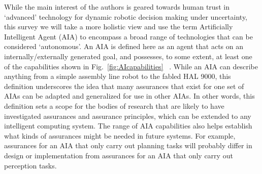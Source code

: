 
    While the main interest of the authors is geared towards human trust in `advanced' technology for dynamic robotic decision making under uncertainty, this survey we will take a more holistic view and use the term Artificially Intelligent Agent (AIA) to encompass a broad range of technologies that can be considered `autonomous'. 
    An AIA is defined here as an agent that acts on an internally/externally generated goal, and possesses, to some extent, at least one of the capabilities shown in Fig.~\ref{fig:AIcapabilities} ~\cite{Russell2010-wv,Nilsson2009-rp,Luger2008-vf}. 
    While an AIA can describe anything from a simple assembly line robot to the fabled HAL 9000, this definition underscores the idea that many assurances that exist for one set of AIAs can be adapted and generalized for use in other AIAs. 
    In other words, this definition sets a scope for the bodies of research that are likely to have investigated assurances and assurance principles, which can be extended to any intelligent computing system. 
    The range of AIA capabilities also helps establish what kinds of assurances might be needed in future systems. 
    For example, assurances for an AIA that only carry out planning tasks will probably differ in design or implementation from assurances for an AIA that only carry out perception tasks. 
    
    
